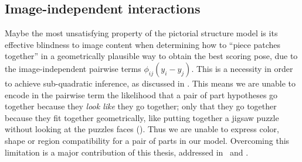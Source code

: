 \subsection{Image-independent interactions}  Maybe the most unsatisfying 
property of the pictorial structure model is its effective blindness to image 
content when determining how to ``piece patches together'' in a geometrically 
plausible way to obtain the best scoring pose, due to the image-independent 
pairwise terms $\phi_{ij}(y_i-y_j)$.  This is a necessity in order to achieve
sub-quadratic inference, as discussed in .  This means we are unable 
to encode in the pairwise term the likelihood that a pair of part hypotheses go 
together because they {\em look like} they go together; only that they go 
together because they fit together geometrically, like putting together a 
jigsaw puzzle without looking at the puzzles faces ().  Thus we 
are unable to express color, shape or region compatibility for a pair of parts 
in our model.  Overcoming this limitation is a major contribution of this 
thesis, addressed in~ and .

